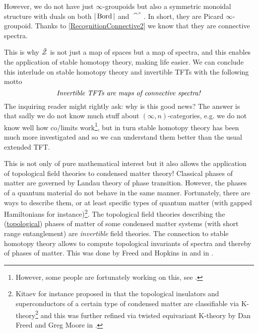 However, we do not have just $\infty$-groupoids but also a symmetric monoidal structure with
 duals on both $|\operatorname{Bord}|$ and $\cat^\times$. In short, they are Picard $\infty$-groupoid. Thanks to 
 \ref{RecognitionConnective2} we know that they are connective
  spectra.
 
 This is why $\tilde{\mathcal{Z}}$ is not just a map of spaces but a map of spectra, and this enables the application of stable homotopy theory, making life easier. We can conclude this interlude on stable homotopy theory and invertible TFTs with the following motto
$$\text{\textit{Invertible TFTs are maps of connective spectra!}}$$
The inquiring reader might rightly ask: why is this good news? 
The answer is that sadly we do not know much stuff about $(\infty,n)$-categories, e.g. we do not
 know well how co/limits 
work\footnote{However, some people are fortunately working on this, see \cite{moser2023inftynlimits}.}, but in turn
stable homotopy theory has been much more investigated and so we can understand them better than the usual
extended TFT.

This is not only of pure mathematical interest but it also allows the application of topological field theories to condensed
 matter
 theory! Classical phases of matter are governed by Landau
 theory of phase transition. However, the phases of a quantum material do not behave in the
  same manner. Fortunately, there are ways to describe them, or at least specific types of quantum
   matter (with gapped Hamiltonians for instance)\footnote{Kitaev for instance proposed in
     \cite{Kitaev_2009} that the topological insulators and superconductors of a certain type of condensed
     matter are classifiable via K-theory\footnote{See
         \url{https://ncatlab.org/nlab/show/topological+phase+of+matter} and
          \url{https://ncatlab.org/nlab/show/K-theory+classification+of+topological+phases+of+matter}.} and
           this was further refined via twisted equivariant K-theory by Dan Freed and Greg Moore in
            \cite{Freed_2013}. }. The topological field theories describing the
             (\href{https://ncatlab.org/nlab/show/topological+phase+of+matter}{topological}) phases of
              matter of some condensed matter systems (with short range entanglement) are
               \emph{invertible} field theories. The connection to stable homotopy theory allows to compute
                topological invariants of spectra and thereby of phases of matter. This was done by Freed and
                 Hopkins in \cite{Freed_2021} and in \cite{freed2014shortrange}.

